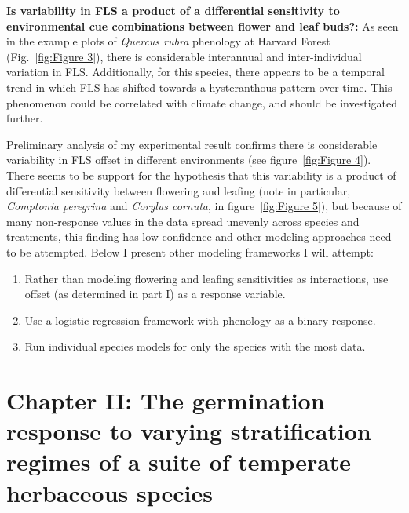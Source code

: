 \documentclass{article}\usepackage[]{graphicx}\usepackage[]{color}
\begin{document}
\par\textbf{Is variability in FLS a product of a differential sensitivity to environmental cue combinations between flower and leaf buds?:} As seen in the  example plots of \textit{Quercus rubra} phenology at Harvard Forest (Fig.~\ref{fig:Figure 3}), there is considerable interannual and inter-individual variation in FLS. Additionally, for this species, there appears to be a temporal trend in which FLS has shifted towards a hysteranthous pattern over time. This phenomenon could be correlated with climate change, and should be investigated further.
\par Preliminary analysis of my experimental result confirms there is considerable variability in FLS offset in different environments (see figure~\ref{fig:Figure 4}).  There seems to be support for the hypothesis that this variability is a product of differential sensitivity between flowering and leafing (note in particular, \textit{Comptonia peregrina} and \textit{Corylus cornuta}, in figure~\ref{fig:Figure 5}), but because of many non-response values in the data spread unevenly across species and treatments, this finding has low confidence and other modeling approaches need to be attempted. Below I present other modeling frameworks I will attempt:
\begin{enumerate}
\item Rather than modeling flowering and leafing sensitivities as interactions, use offset (as determined in part I) as a response variable.
\item Use a logistic regression framework with phenology as a binary response.
\item Run individual species models for only the species with the most data.
\end{enumerate}

\section*{Chapter II: The germination response to varying stratification regimes of a suite of temperate herbaceous species}
\end{document}
